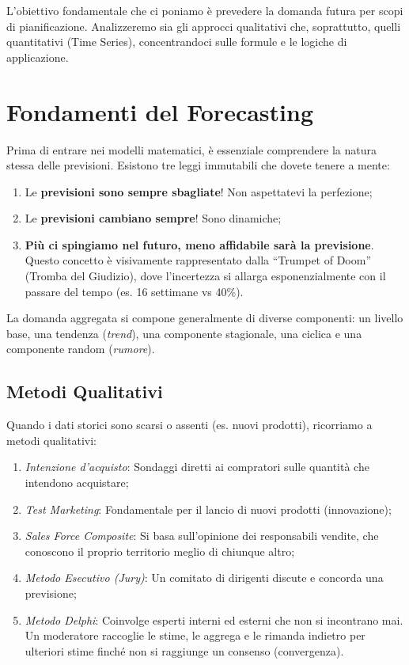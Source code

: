 L'obiettivo fondamentale che ci poniamo è prevedere la domanda futura per scopi di pianificazione. Analizzeremo sia gli approcci qualitativi che, soprattutto, quelli quantitativi (Time Series), concentrandoci sulle formule e le logiche di applicazione.

%
\section{Fondamenti del Forecasting}
Prima di entrare nei modelli matematici, è essenziale comprendere la natura stessa delle previsioni. Esistono tre leggi immutabili che dovete tenere a mente:
\begin{enumerate}
    \item Le \textbf{previsioni sono sempre sbagliate}! Non aspettatevi la perfezione;
    \item Le \textbf{previsioni cambiano sempre}! Sono dinamiche;
    \item \textbf{Più ci spingiamo nel futuro, meno affidabile sarà la previsione}. Questo concetto è visivamente rappresentato dalla ``Trumpet of Doom'' (Tromba del Giudizio), dove l'incertezza si allarga esponenzialmente con il passare del tempo (es. 16 settimane vs 40\%).
\end{enumerate}
La domanda aggregata si compone generalmente di diverse componenti: un livello base, una tendenza (\emph{trend}), una componente stagionale, una ciclica e una componente random (\emph{rumore}).

%
\subsection{Metodi Qualitativi}
Quando i dati storici sono scarsi o assenti (es. nuovi prodotti), ricorriamo a metodi qualitativi:
\begin{enumerate}
    \item \emph{Intenzione d'acquisto}: Sondaggi diretti ai compratori sulle quantità che intendono acquistare;
    \item \emph{Test Marketing}: Fondamentale per il lancio di nuovi prodotti (innovazione);
    \item \emph{Sales Force Composite}: Si basa sull'opinione dei responsabili vendite, che conoscono il proprio territorio meglio di chiunque altro;
    \item \emph{Metodo Esecutivo (Jury)}: Un comitato di dirigenti discute e concorda una previsione;
    \item \emph{Metodo Delphi}: Coinvolge esperti interni ed esterni che non si incontrano mai. Un moderatore raccoglie le stime, le aggrega e le rimanda indietro per ulteriori stime finché non si raggiunge un consenso (convergenza).
\end{enumerate}

